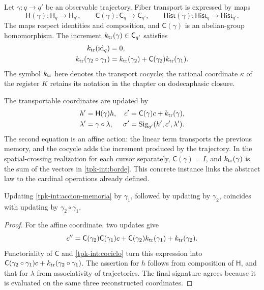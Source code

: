 Let \(\gamma:q\to q'\) be an observable trajectory. Fiber
transport is expressed by maps
\[
 \mathsf H(\gamma):\mathsf H_q\to\mathsf H_{q'},\qquad
 \mathsf C(\gamma):\mathsf C_q\to\mathsf C_{q'},\qquad
 \mathsf{Hist}(\gamma):\mathsf{Hist}_q\to\mathsf{Hist}_{q'}.
\]
The maps respect identities and composition, and
\(\mathsf C(\gamma)\) is an abelian-group homomorphism.
The increment \(k_{\rm tr}(\gamma)\in\mathsf C_{q'}\) satisfies
\begin{equation}
 \begin{split}
 k_{\rm tr}(\operatorname{id}_q)&=0,\\
 k_{\rm tr}(\gamma_2\circ\gamma_1)
 &=k_{\rm tr}(\gamma_2)+
   \mathsf C(\gamma_2)k_{\rm tr}(\gamma_1).
 \end{split}
 \label{tpk-int:cociclo}
\end{equation}
The symbol \(k_{\rm tr}\) here denotes the transport cocycle;
the rational coordinate \(\kappa\) of the register \(K\) retains
its notation in the chapter on dodecaphasic closure.

The transportable coordinates are updated by
\begin{equation}
 \begin{aligned}
 h'&=\mathsf H(\gamma)h,&
 c'&=\mathsf C(\gamma)c+k_{\rm tr}(\gamma),\\
 \lambda'&=\gamma\circ\lambda,&
 \sigma'&=\operatorname{Sig}_{q'}(h',c',\lambda').
 \end{aligned}
 \label{tpk-int:accion-memoria}
\end{equation}
The second equation is an affine action: the linear term transports
the previous memory, and the cocycle adds the increment produced by the
trajectory. In the spatial-crossing realization for each cursor separately,
\(\mathsf C(\gamma)=I\), and \(k_{\rm tr}(\gamma)\) is the sum
of the vectors in \eqref{tpk-int:borde}. This concrete instance
links the abstract law to the cardinal operations already defined.

\begin{proposition}
\label{tpk-int:composicion-memoria}
Updating \eqref{tpk-int:accion-memoria} by
\(\gamma_1\), followed by updating by \(\gamma_2\),
coincides with updating by \(\gamma_2\circ\gamma_1\).
\end{proposition}
\begin{proof}
For the affine coordinate, two updates give
\[
 c''=\mathsf C(\gamma_2)\mathsf C(\gamma_1)c
       +\mathsf C(\gamma_2)k_{\rm tr}(\gamma_1)
       +k_{\rm tr}(\gamma_2).
\]
Functoriality of \(\mathsf C\) and
\eqref{tpk-int:cociclo} turn this expression into
\(\mathsf C(\gamma_2\circ\gamma_1)c+
k_{\rm tr}(\gamma_2\circ\gamma_1)\).
The assertion for \(h\) follows from composition of
\(\mathsf H\), and that for \(\lambda\) from associativity of
trajectories. The final signature agrees because it is evaluated on the same
three reconstructed coordinates.
\end{proof}

